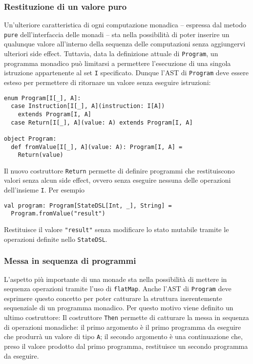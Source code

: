 \subsubsection{Restituzione di un valore puro}
Un'ulteriore caratteristica di ogni computazione monadica -- espressa dal metodo \lstinline{pure} dell'interfaccia delle monadi -- sta nella possibilità di poter inserire un qualunque valore all'interno della sequenza delle computazioni senza aggiungervi ulteriori side effect.
Tuttavia, data la definizione attuale di \lstinline{Program}, un programma monadico può limitarsi a permettere l'esecuzione di una singola istruzione appartenente al set \lstinline{I} specificato. Dunque l'AST di \lstinline{Program} deve essere esteso per permettere di ritornare un valore senza eseguire istruzioni:
\begin{lstlisting}[language=scala3]
enum Program[I[_], A]:
  case Instruction[I[_], A](instruction: I[A])
    extends Program[I, A]
  case Return[I[_], A](value: A) extends Program[I, A]

object Program:
  def fromValue[I[_], A](value: A): Program[I, A] =
    Return(value)
\end{lstlisting}

Il nuovo costruttore \lstinline{Return} permette di definire programmi che restituiscono valori senza alcun side effect, ovvero senza eseguire nessuna delle operazioni dell'insieme \lstinline{I}. Per esempio
\begin{lstlisting}[language=scala3]
val program: Program[StateDSL[Int, _], String] =
  Program.fromValue("result")
\end{lstlisting}
Restituisce il valore \lstinline{"result"} senza modificare lo stato mutabile tramite le operazioni definite nello \lstinline{StateDSL}.

\subsubsection{Messa in sequenza di programmi}
L'aspetto più importante di una monade sta nella possibilità di mettere in sequenza operazioni tramite l'uso di \lstinline{flatMap}.
Anche l'AST di \lstinline{Program} deve esprimere questo concetto per poter catturare la struttura inerentemente sequenziale di un programma monadico. Per questo motivo viene definito un ultimo costruttore:
Il costruttore \lstinline{Then} permette di catturare la messa in sequenza di operazioni monadiche: il primo argomento è il primo programma da eseguire che produrrà un valore di tipo \lstinline{A}; il secondo argomento è una continuazione che, preso il valore prodotto dal primo programma, restituisce un secondo programma da eseguire.


